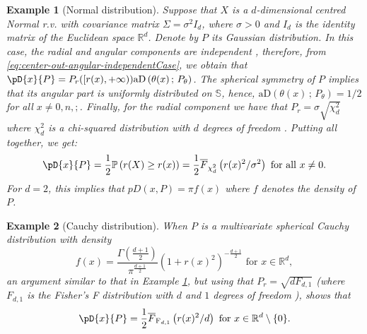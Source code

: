 \documentclass{article}
\numberwithin{equation}{section}
\newtheorem{example}{Example}[section]
\newcommand{\R}{\mathbb{R}}
\renewcommand{\P}{\mathbb{P}}
\newcommand{\sphere}{\mathbb{S}}
\newcommand{\coD}[2]{\pD{#1}{#2}}
\newcommand{\aD}[2]{{\mathrm{aD}}\left({#1}\,;\,{#2}\right)}
\begin{document}
\begin{example}[Normal
    distribution]\label{ex:pD_for_normal_distribution} Suppose that $X$ is a $d$-dimensional centred Normal r.v. with covariance matrix
    \(\Sigma=\sigma^2 I_d\), where $\sigma>0$ and $I_d$ is the identity matrix of the Euclidean space \(\R^d\). Denote by \(P\) its Gaussian distribution. In this case, the radial and
    angular components
    are independent \cite[pp. 30]{Wang1990}, therefore, from
    \eqref{eq:center-out-angular-independentCase}, we obtain that
    \(\coD{x}{P}=P_r([r(x),+\infty))\aD{\theta(x)}{P_{\theta}}\). The
    spherical symmetry of \(P\)
    implies that its angular part is uniformly distributed on
    \(\sphere\), hence, \(\aD{\theta(x)}{P_{\theta}}=1/2\) for all
    \(x\neq 0,n, ;\). %
    Finally, for the radial component we have that
    \(P_r=\sigma\sqrt{\chi^2_d}\) where \(\chi^2_d\) is a chi-squared
    distribution
    with \(d\) degrees of freedom \cite[pp. 32]{Wang1990}.
    Putting all together, we get:
    \begin{equation}\label{eq:example:pD_centred_normal_distribution}
        \coD{x}{P}=\frac{1}{2}\P\left( r(X)\geq r(x) \right) =
        \frac{1}{2}\overline{F}_{\chi^2_d}\left(
        r(x)^2/\sigma^2 \right) \text{ for all } x\neq 0.
    \end{equation}
    For \(d=2\), this implies that \(pD(x,P)=\pi f(x)\) where \(f\) denotes
    the density of \(P\).
\end{example}

\begin{example}[Cauchy distribution] When \(P\) is a multivariate
    spherical Cauchy distribution
    with density
    \begin{equation}
        f(x) = \frac{\Gamma\!\left(\frac{d+1}{2}\right)}{\pi^{\frac{d+1}{2}}}
        \left( 1 + r(x)^{2} \right)^{-\frac{d+1}{2}} \text{ for }
     x \in \mathbb{R}^d,
    \end{equation}
    an argument similar to that in Example
    \ref{ex:pD_for_normal_distribution}, but using that
    \(P_r=\sqrt{dF_{d,1}}\) (where \(F_{d,1}\) is the Fisher's F
        distribution with \(d\)
    and \(1\) degrees of freedom \cite[pp. 7]{KotzNadarajah2004}), shows that
    \begin{equation}
        \coD{x}{P}=\frac{1}{2}\overline{F}_{\textnormal{F}_{d,1}}\left(
        r(x)^2/d \right) \text{ for } x \in \mathbb{R}^d\setminus\{0\}.
    \end{equation}
\end{example}
\end{document}
